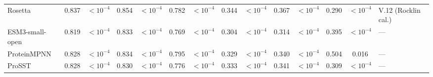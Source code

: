 \begin{table}[H]
{\begin{tabular}{lccccccccccccl}
Rosetta & 0.837 & $<10^{-4}$ & 0.854 & $<10^{-4}$ & 0.782 & $<10^{-4}$ & 0.344 & $<10^{-4}$ & 0.367 & $<10^{-4}$ & 0.290 & $<10^{-4}$ & V.12 (Rocklin cal.) \\
ESM3-small-open & 0.819 & $<10^{-4}$ & 0.833 & $<10^{-4}$ & 0.769 & $<10^{-4}$ & 0.304 & $<10^{-4}$ & 0.314 & $<10^{-4}$ & 0.395 & $<10^{-4}$ & --- \\
ProteinMPNN & 0.828 & $<10^{-4}$ & 0.834 & $<10^{-4}$ & 0.795 & $<10^{-4}$ & 0.329 & $<10^{-4}$ & 0.340 & $<10^{-4}$ & 0.504 & 0.016 & --- \\
ProSST & 0.828 & $<10^{-4}$ & 0.830 & $<10^{-4}$ & 0.776 & $<10^{-4}$ & 0.333 & $<10^{-4}$ & 0.341 & $<10^{-4}$ & 0.309 & $<10^{-4}$ & --- \\
\bottomrule
\end{tabular}
}
\end{table}


